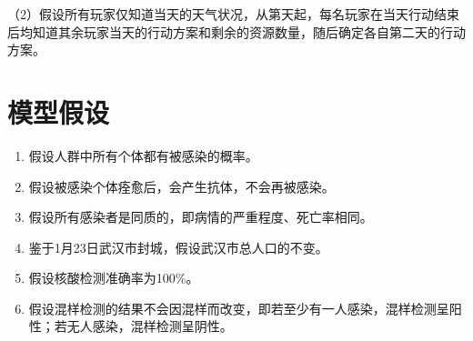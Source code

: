 \documentclass[withoutpre]{cumcmthesis} %
\begin{document}
（2）假设所有玩家仅知道当天的天气状况，从第天起，每名玩家在当天行动结束后均知道其余玩家当天的行动方案和剩余的资源数量，随后确定各自第二天的行动方案。\\

\section{模型假设}
\begin{enumerate}
    \item 假设人群中所有个体都有被感染的概率。
    \item 假设被感染个体痊愈后，会产生抗体，不会再被感染。
    \item 假设所有感染者是同质的，即病情的严重程度、死亡率相同。
    \item 鉴于1月23日武汉市封城，假设武汉市总人口的不变。
    \item 假设核酸检测准确率为100\%。
    \item 假设混样检测的结果不会因混样而改变，即若至少有一人感染，混样检测呈阳性；若无人感染，混样检测呈阴性。
\end{enumerate}
\end{document}
